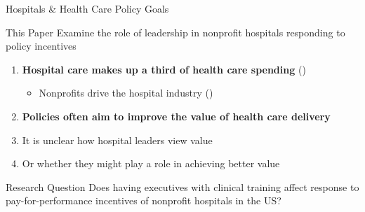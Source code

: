 \documentclass[notes,11pt, aspectratio=169]{beamer}
\newenvironment{wideitemize}{\itemize\addtolength{\itemsep}{10pt}}{\enditemize}
\begin{document}
\begin{frame}{Hospitals \& Health Care Policy Goals}

\begin{block}{This Paper}
    Examine the role of leadership in nonprofit hospitals responding to policy incentives 
\end{block}

\vspace{5mm}

\begin{enumerate}
    \item \textbf{Hospital care makes up a third of health care spending} \scriptsize (\cite{cms2024nhe}) \normalsize

\vspace{2mm}
    
    \begin{itemize}
        \item Nonprofits drive the hospital industry \scriptsize (\cite{ASPE_2023}) \normalsize
    \end{itemize}

\vspace{5mm}

    \item \textbf{Policies often aim to improve the value of health care delivery}

\vspace{2mm}

    \begin{wideitemize}
        \item It is unclear how hospital leaders view value
        \item Or whether they might play a role in achieving better value
    \end{wideitemize}

    \end{enumerate}
\end{frame}

\begin{frame}{Research Question}
    \centering
    \large
    Does having executives with clinical training affect response to pay-for-performance incentives of nonprofit hospitals in the US?
\end{frame}
\end{document}
